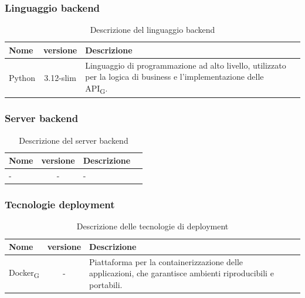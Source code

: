 \documentclass[11pt,a4paper]{article}
\newcommand{\gls}[1]{#1\textsubscript{G}}
\begin{document}
\subsubsection{Linguaggio backend}
    \begin{table}[H]
        \centering
        \begin{tabular}{|l|c|>{\raggedright\arraybackslash}p{}|p{}|}
            \hline
            \textbf{Nome} & \textbf{versione} & \textbf{Descrizione} \\
            \hline
            Python & 3.12-slim & Linguaggio di programmazione ad alto livello, utilizzato per la logica di business e l'implementazione delle \gls{API}. \\
            \hline
        \end{tabular}
        \caption{Descrizione del linguaggio backend}
        \label{tab:linguaggio_backend}
    \end{table}
\subsubsection{Server backend}
    \begin{table}[H]
        \centering
        \begin{tabular}{|l|c|>{\raggedright\arraybackslash}p{}|p{}|}
            \hline
            \textbf{Nome} & \textbf{versione} & \textbf{Descrizione} \\
            \hline
            - & - & - \\
            \hline
        \end{tabular}
        \caption{Descrizione del server backend}
        \label{tab:server_backend}
    \end{table}
\subsubsection{Tecnologie deployment}
    \begin{table}[H]
        \centering
        \begin{tabular}{|l|c|>{\raggedright\arraybackslash}p{}|p{}|}
            \hline
            \textbf{Nome} & \textbf{versione} & \textbf{Descrizione} \\
            \hline
            \gls{Docker} & - & Piattaforma per la containerizzazione delle applicazioni, che garantisce ambienti riproducibili e portabili. \\
            \hline
        \end{tabular}
        \caption{Descrizione delle tecnologie di deployment}
        \label{tab:tecnologie_deployment}
    \end{table}
\end{document}
